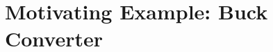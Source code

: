 \documentclass[british,compsoc]{IEEEtran}
\newcommand{\noun}[1]{\textsc{#1}}
\begin{document}




\section{Motivating Example: Buck Converter\label{sec:Motivating Example}}
\end{document}
